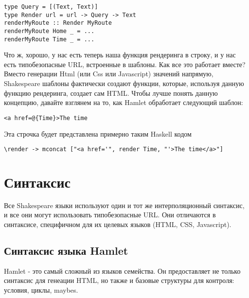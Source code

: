 \begin{lstlisting}
type Query = [(Text, Text)]                                                     
type Render url = url -> Query -> Text                                          
renderMyRoute :: Render MyRoute                                                 
renderMyRoute Home _ = ...                                                      
renderMyRoute Time _ = ...   
\end{lstlisting}

Что ж, хорошо, у нас есть теперь наша функция рендеринга в строку, и у нас есть
типобезопасные URL, встроенные в шаблоны. Как все это работает вместе?
Вместо генерации Html (или Css или Javascript) значений напрямую, 
Shakespeare шаблоны фактически создают функции, которые, используя данную
функцию рендеринга, создает сам HTML. Чтобы лучше понять данную концепцию,
давайте взглянем на то, как Hamlet обработает следующий шаблон:

\begin{lstlisting}
<a href=@{Time}>The time                                                        
\end{lstlisting}
                                                                                
Эта строчка будет представлена примерно таким Haskell кодом 

\begin{lstlisting}
\render -> mconcat ["<a href='", render Time, "'>The time</a>"]     
\end{lstlisting}

\section{Синтаксис}
Все Shakespeare языки используют один и тот же интерполяционный синтаксис, 
и все они могут использовать типобезопасные URL. Они отличаются в синтаксисе,
специфичном для их целевых языков (HTML, CSS, Javascript).

\subsection{Синтаксис языка Hamlet}
Hamlet - это самый сложный из языков семейства. Он предоставляет не только 
синтаксис для генеации HTML, но также и базовые структуры для контроля: 
условия, циклы, maybes.

